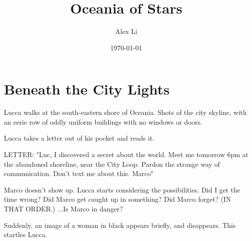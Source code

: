 \documentclass[11pt]{article}
\begin{document}
\begin{titlepage}
\title{Oceania of Stars}
\author{Alex Li}
\date{\today} %
\maketitle
\thispagestyle{empty} %
\end{titlepage}



\tableofcontents
\newpage %






\section{Beneath the City Lights}

Lucca walks at the south-eastern shore of Oceania. Shots of the city skyline, with an eerie row of oddly uniform buildings with no windows or doors. 

Lucca takes a letter out of his pocket and reads it.

LETTER: "Luc, I discovered a secret about the world. 
Meet me tomorrow 6pm at the abandoned shoreline, near the City Loop. 
Pardon the strange way of communication. 
Don't text me about this. Marco"

Marco doesn't show up. Lucca starts considering the possibilities. Did I get the time wrong? Did Marco get caught up in something? Did Marco forget? (IN THAT ORDER.) ...Is Marco in danger?

Suddenly, an image of a woman in black appears briefly, and disappears. This startles Lucca. 
\end{document}
